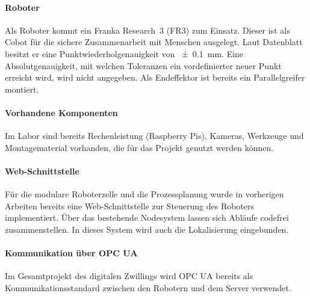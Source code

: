 \paragraph{Roboter}
Als Roboter kommt ein Franka Research~3 (FR3) zum Einsatz. Dieser ist als Cobot für die sichere Zusammenarbeit mit Menschen ausgelegt. Laut Datenblatt \cite{Franka2025Datenblatt} besitzt er eine Punktwiederholgenauigkeit von \SI{\pm 0,1}{\milli\metre}. Eine Absolutgenauigkeit, mit welchen Toleranzen ein vordefinierter neuer Punkt erreicht wird, wird nicht angegeben. Als Endeffektor ist bereits ein Parallelgreifer montiert.

\paragraph{Vorhandene Komponenten}
Im Labor sind bereits Rechenleistung (Raspberry Pis), Kameras, Werkzeuge und Montagematerial vorhanden, die für das Projekt genutzt werden können.

\paragraph{Web-Schnittstelle}
Für die modulare Roboterzelle und die Prozessplanung wurde in vorherigen Arbeiten bereits eine Web-Schnittstelle zur Steuerung des Roboters implementiert. 
Über das bestehende Nodesystem lassen sich Abläufe codefrei zusammenstellen. In dieses System wird auch die Lokalisierung eingebunden.

\paragraph{Kommunikation über OPC UA}
Im Gesamtprojekt des digitalen Zwillings wird OPC UA bereits als Kommunikationsstandard zwischen den Robotern und dem Server verwendet.


